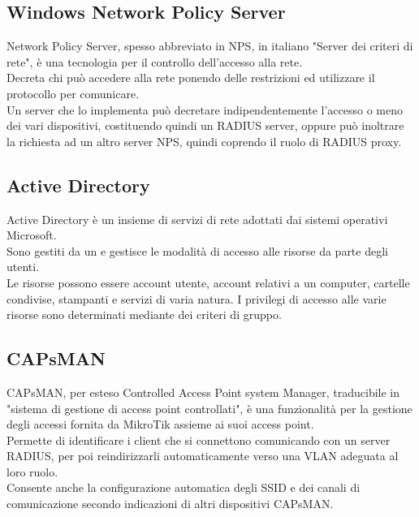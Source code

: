 \documentclass[Tesi.tex]{subfiles}
\begin{document}
\subsection{Windows Network Policy Server}
Network Policy Server, spesso abbreviato in NPS, in italiano "Server dei criteri di rete", è una tecnologia per il controllo dell'accesso alla rete. \\
Decreta chi può accedere alla rete ponendo delle restrizioni ed utilizzare il protocollo  per comunicare. \\
Un server che lo implementa può decretare indipendentemente l'accesso o meno dei vari dispositivi, costituendo quindi un RADIUS server, oppure può inoltrare la richiesta ad un altro server NPS, quindi coprendo il ruolo di RADIUS proxy.

\subsection{Active Directory}
Active Directory è un insieme di servizi di rete adottati dai sistemi operativi Microsoft. \\
Sono gestiti da un  e gestisce le modalità di accesso alle risorse da parte degli utenti. \\
Le risorse possono essere account utente, account relativi a un computer, cartelle condivise, stampanti e servizi di varia natura. I privilegi di accesso alle varie risorse sono determinati mediante dei criteri di gruppo.

\subsection{CAPsMAN}
CAPsMAN, per esteso Controlled Access Point system Manager, traducibile in "sistema di gestione di access point controllati", è una funzionalità per la gestione degli accessi fornita da MikroTik assieme ai suoi access point. \\
Permette di identificare i client che si connettono comunicando con un server RADIUS, per poi reindirizzarli automaticamente verso una VLAN adeguata al loro ruolo. \\
Consente anche la configurazione automatica degli SSID e dei canali di comunicazione secondo indicazioni di altri dispositivi CAPsMAN.
\end{document}

